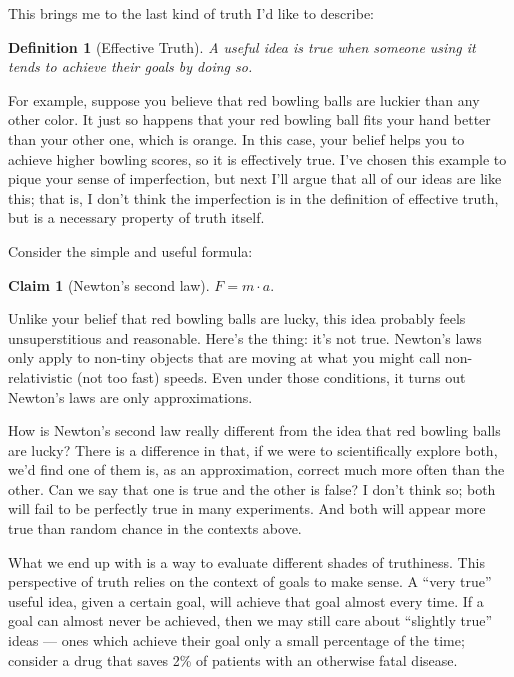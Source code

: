 \documentclass[11pt, oneside]{article}   	%
\newtheorem{defn}{Definition}
\newtheorem{claim}{Claim}
\begin{document}
This brings me to the last kind of truth I'd like to describe:
\begin{defn}[Effective Truth]\label{d8}
    A useful idea is true when someone using it tends to achieve their goals by
    doing so.
\end{defn}

For example, suppose you believe that red bowling balls are luckier than any
other color. It just so happens that your red bowling ball fits your hand better
than your other one, which is orange.
In this case, your belief helps you to
achieve higher bowling scores, so it is effectively true.
I've chosen this example to pique your sense of imperfection, but next I'll
argue that all of our ideas are like this; that is, I don't think the
imperfection is in the definition of effective truth,
but is a necessary property of truth itself.

Consider the simple and useful formula:
\begin{claim}[Newton's second law]
    $F = m \cdot a.$
\end{claim}

Unlike your belief that red bowling balls are lucky, this idea probably feels
unsuperstitious and reasonable. Here's the thing: it's not true.
Newton's laws only apply to non-tiny
objects that are moving at what you might call non-relativistic (not too fast)
speeds. Even under those conditions,
it turns out Newton's laws are only approximations.

How is Newton's second law really different from the idea that red bowling balls
are
lucky? There is a difference in that, if we were to scientifically explore both,
we'd find one of them is, as an approximation, correct much more often than the
other. Can we say that one is true and the other is false? I don't think so;
both will fail to be perfectly true in many experiments. And both will appear
more true than random chance in the contexts above.

What we end up with is a way to evaluate different shades of truthiness.
This perspective of truth relies on the context of goals to make sense.
A ``very true'' useful idea, given
a certain goal, will achieve that goal almost every time. If a goal can
almost never be achieved, then we may still care about ``slightly true'' ideas
--- ones which achieve their goal only a small percentage of the time;
consider a drug that saves 2\% of patients with an otherwise fatal disease.
\end{document}
